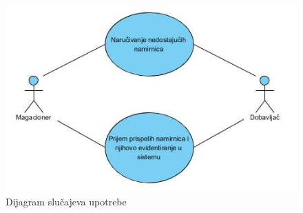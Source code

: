 \begin{figure}[ht]
    \leavevmode
    \begin{center}
    \includegraphics[height=0.4\textheight]{slike/Upravljanje_namirnicama.JPG}
    \end{center}
    \caption{Dijagram slu\v cajeva upotrebe} %
    \label{fig:slika8}
\end{figure}
 
 
 
 
 
 
